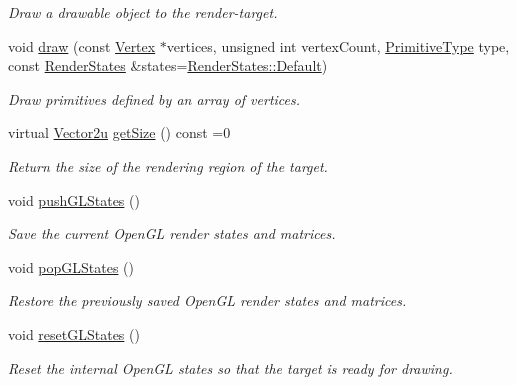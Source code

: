 \begin{DoxyCompactItemize}
\begin{DoxyCompactList}\small\item\em Draw a drawable object to the render-\/target. \end{DoxyCompactList}\item 
void \hyperlink{classsf_1_1_render_target_ab636d7363f6681077361ee274ba89a8d}{draw} (const \hyperlink{classsf_1_1_vertex}{Vertex} $\ast$vertices, unsigned int vertex\+Count, \hyperlink{group__graphics_ga5ee56ac1339984909610713096283b1b}{Primitive\+Type} type, const \hyperlink{classsf_1_1_render_states}{Render\+States} \&states=\hyperlink{classsf_1_1_render_states_ad29672df29f19ce50c3021d95f2bb062}{Render\+States\+::\+Default})
\begin{DoxyCompactList}\small\item\em Draw primitives defined by an array of vertices. \end{DoxyCompactList}\item 
virtual \hyperlink{classsf_1_1_vector2}{Vector2u} \hyperlink{classsf_1_1_render_target_a2e5ade2457d9fb4c4907ae5b3d9e94a5}{get\+Size} () const =0
\begin{DoxyCompactList}\small\item\em Return the size of the rendering region of the target. \end{DoxyCompactList}\item 
void \hyperlink{classsf_1_1_render_target_a8d1998464ccc54e789aaf990242b47f7}{push\+G\+L\+States} ()
\begin{DoxyCompactList}\small\item\em Save the current Open\+G\+L render states and matrices. \end{DoxyCompactList}\item 
void \hyperlink{classsf_1_1_render_target_ad5a98401113df931ddcd54c080f7aa8e}{pop\+G\+L\+States} ()
\begin{DoxyCompactList}\small\item\em Restore the previously saved Open\+G\+L render states and matrices. \end{DoxyCompactList}\item 
void \hyperlink{classsf_1_1_render_target_aac7504990d27dada4bfe3c7866920765}{reset\+G\+L\+States} ()
\begin{DoxyCompactList}\small\item\em Reset the internal Open\+G\+L states so that the target is ready for drawing. \end{DoxyCompactList}\end{DoxyCompactItemize}
